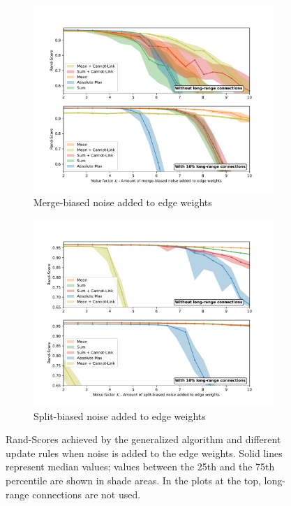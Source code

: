 % 

\begin{figure}
\centering
        \begin{subfigure}[t]{0.49 \textwidth}
        \centering
        \includegraphics[width=\textwidth,trim=0.55in 0.35in 0.65in 0.80in,clip]{./figs/merge_noise.pdf}

        \caption{Merge-biased noise added to edge weights} \label{fig:thresh}
    \end{subfigure}%
    \begin{subfigure}[t]{0.49 \textwidth}
        \centering
        \includegraphics[width=\textwidth,trim=0.53in 0.35in 0.65in 0.80in,clip]{./figs/split_noise.pdf}
        \caption{Split-biased noise added to edge weights} \label{fig:ws}
    \end{subfigure}
\caption{{\small Rand-Scores achieved by the generalized algorithm and different update rules when noise is added to the edge weights. Solid lines represent median values; values between the 25th and the 75th percentile are shown in shade areas. In the plots at the top, long-range connections are not used.}}\label{fig:noise_plots}
\end{figure}

